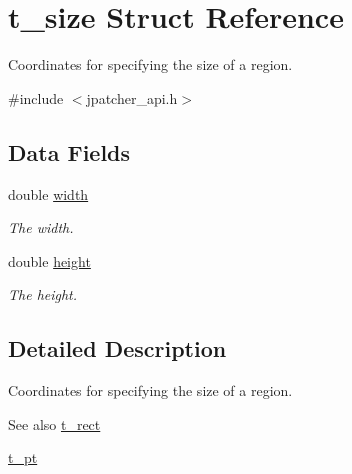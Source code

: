 \hypertarget{structt__size}{
\section{t\_\-size Struct Reference}
\label{structt__size}
}


Coordinates for specifying the size of a region.  


{\ttfamily \#include $<$jpatcher\_\-api.h$>$}\subsection*{Data Fields}
\begin{DoxyCompactItemize}
\item 
\hypertarget{structt__size_ae9a82c72ca8a72cdf94685a9cb2e1ef6}{
double \hyperlink{structt__size_ae9a82c72ca8a72cdf94685a9cb2e1ef6}{width}}
\label{structt__size_ae9a82c72ca8a72cdf94685a9cb2e1ef6}

\begin{DoxyCompactList}\small\item\em The width. \item\end{DoxyCompactList}\item 
\hypertarget{structt__size_aa7ec2bdc3c47d9e01bffdab3c63b3112}{
double \hyperlink{structt__size_aa7ec2bdc3c47d9e01bffdab3c63b3112}{height}}
\label{structt__size_aa7ec2bdc3c47d9e01bffdab3c63b3112}

\begin{DoxyCompactList}\small\item\em The height. \item\end{DoxyCompactList}\end{DoxyCompactItemize}


\subsection{Detailed Description}
Coordinates for specifying the size of a region. \begin{DoxySeeAlso}{See also}
\hyperlink{structt__rect}{t\_\-rect} 

\hyperlink{structt__pt}{t\_\-pt} 
\end{DoxySeeAlso}
